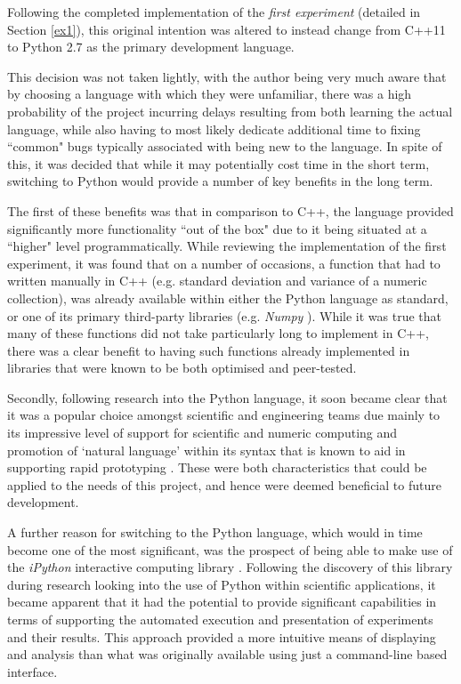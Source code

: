 Following the completed implementation of the \textit{first experiment} (detailed in Section \ref{ex1}), this original intention was altered to instead change from C++11 to Python 2.7 as the primary development language. 

This decision was not taken lightly, with the author being very much aware that by choosing a language with which they were unfamiliar, there was a high probability of the project incurring delays resulting from both learning the actual language, while also having to most likely dedicate additional time to fixing ``common" bugs typically associated with being new to the language. In spite of this, it was decided that while it may potentially cost time in the short term, switching to Python would provide a number of key benefits in the long term. 

The first of these benefits was that in comparison to C++, the language provided significantly more functionality ``out of the box" due to it being situated at a ``higher" level programmatically. While reviewing the implementation of the first experiment, it was found that on a number of occasions, a function that had to written manually in C++ (e.g. standard deviation and variance of a numeric collection), was already available within either the Python language as standard, or one of its primary third-party libraries (e.g. \textit{Numpy} \cite{numpy}). While it was true that many of these functions did not take particularly long to implement in C++, there was a clear benefit to having such functions already implemented in libraries that were known to be both optimised and peer-tested. 

Secondly, following research into the Python language, it soon became clear that it was a popular choice amongst scientific and engineering teams due mainly to its impressive level of support for scientific and numeric computing \cite{perez} and promotion of `natural language' within its syntax that is known to aid in supporting rapid prototyping \cite{ramanujam}. These were both characteristics that could be applied to the needs of this project, and hence were deemed beneficial to future development.


A further reason for switching to the Python language, which would in time become one of the most significant, was the prospect of being able to make use of the \textit{iPython} interactive computing library \cite{ipython}. Following the discovery of this library during research looking into the use of Python within scientific applications, it became apparent that it had the potential to provide significant capabilities in terms of supporting the automated execution and presentation of experiments and their results. This approach provided a more  intuitive means of displaying and analysis than what was originally available using just a command-line based interface. 

